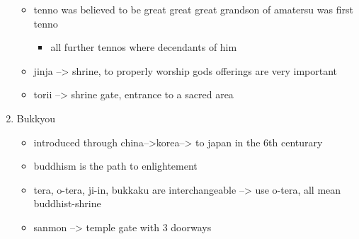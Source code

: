 \documentclass{article}
\newcommand\tabni[1][0.2cm]{\hspace*{#1}}
\begin{document}
\begin{enumerate}[itemsep=-6pt]
\begin{itemize}
\item tenno was believed to be great great great grandson of amatersu was first tenno
\begin{itemize}%
\item all further tennos where decendants of him
\end{itemize}
\item jinja --> shrine, to properly worship gods offerings are very important
\item torii --> shrine gate, entrance to a sacred area \\
\end{itemize}
\item {} \tabni Bukkyou
\begin{itemize}
\item introduced through china-->korea--> to japan in the 6th centurary
\item buddhism is the path to enlightement
\item tera, o-tera, ji-in, bukkaku are interchangeable --> use o-tera, all mean buddhist-shrine
\item sanmon --> temple gate with 3 doorways \\
\end{itemize}


\end{enumerate}
\end{document}

